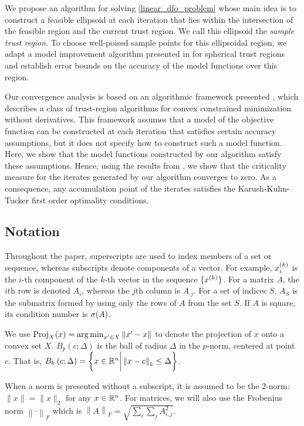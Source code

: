 \documentclass{article}
\begin{document}
We propose an algorithm for solving \cref{linear_dfo_problem} whose main idea is to construct a feasible ellipsoid at each iteration that lies within the intersection of the feasible region and the current trust region.   We call this ellipsoid the {\em sample trust region}.
To choose well-poised sample points for this ellipsoidal region,  we adapt a model improvement algorithm presented in \cite{introduction_book} for spherical trust regions and establish error bounds on the accuracy of the model functions over this region.    

Our convergence analysis is based on an algorithmic framework presented \cite{Conejo:2013:GCT:2620806.2621814},  which describes a class of trust-region algorithms for convex constrained minimization without derivatives.   This framework assumes that a model of the objective function can be constructed at each iteration that satisfies certain accuracy assumptions, but it does not specify how to construct such a model function.    Here, we show that the model functions constructed by our algorithm satisfy these assumptions.  Hence,  using the results from \cite{Conejo:2013:GCT:2620806.2621814}, we show that
the criticality measure for the iterates generated by our algorithm converges to zero.  As a consequence, any accumulation point of the iterates satisfies the Karush-Kuhn-Tucker first order optimality conditions.  


\subsection{Notation}

Throughout the paper, superscripts are used to index members of a set or sequence, whereas subscripts denote components of a vector.  For example,  
$x_i^{(k)}$ is the $i$-th component of the $k$-th vector in the sequence $\{x^{(k)}\}$.
For a matrix $A$,  the $i$th row is denoted $A_i$, whereas the $j$th column is $A_{\cdot j}$.  
For a set of indices $S$,  $A_S$ is the submatrix formed by using only the rows of $A$ from the set $S$.   If $A$ is square, its condition number is ${\sigma}(A)$. 

We use ${\textrm{Proj}}_X(x) = \operatorname*{arg\,min}_{x' \in X}\left\|x' - x\right\|$ to denote the projection of $x$ onto a convex set $X$.   $B_p\left(c; \Delta\right)$ is the ball of radius $\Delta$ in the $p$-norm, centered at point $c$.  That is,  $B_k\left(c; \Delta\right) = \left\{x \in \mathbb R^n \bigg | \left\|x - c\right\|_k \le \Delta \right\}$.

When a norm is presented without a subscript, it is assumed to be the 2-norm: $\|x\| = \|x\|_2$ for any $x \in \mathbb R^n$.  For matrices, we will also use the Frobenius norm $\left\|\cdot\right\|_F$ which is $\left\|A\right\|_F = \sqrt{\sum_i\sum_jA_{i, j}^2}$.
\end{document}
